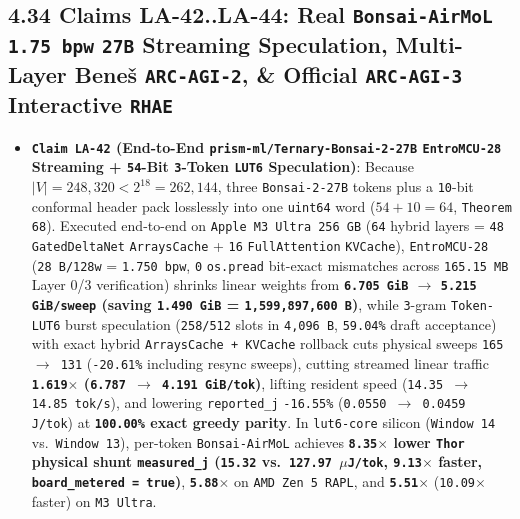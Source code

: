 \documentclass[10pt]{article}
\begin{document}
\subsection{4.34 Claims LA-42..LA-44: Real \texttt{Bonsai-AirMoL} \texttt{1.75 bpw} \texttt{27B} Streaming Speculation, Multi-Layer Bene\v{s} \texttt{ARC-AGI-2}, \& Official \texttt{ARC-AGI-3} Interactive \texttt{RHAE}}\label{claim-la42}

\begin{itemize}
  \item \textbf{\texttt{Claim LA-42} (End-to-End \texttt{prism-ml/Ternary-Bonsai-2-27B} \texttt{EntroMCU-28} Streaming + \texttt{54}-Bit \texttt{3}-Token \texttt{LUT6} Speculation)}: Because $|V| = 248{,}320 < 2^{18} = 262{,}144$, three \texttt{Bonsai-2-27B} tokens plus a \texttt{10}-bit conformal header pack losslessly into one \texttt{uint64} word ($54 + 10 = 64$, \texttt{Theorem 68}). Executed end-to-end on \texttt{Apple M3 Ultra 256 GB} (\texttt{64} hybrid layers = \texttt{48} \texttt{GatedDeltaNet} \texttt{ArraysCache} + \texttt{16} \texttt{FullAttention} \texttt{KVCache}), \texttt{EntroMCU-28} (\texttt{28 B/128w} = \texttt{1.750 bpw}, \texttt{0} \texttt{os.pread} bit-exact mismatches across \texttt{165.15 MB} Layer 0/3 verification) shrinks linear weights from \textbf{\texttt{6.705 GiB} $\to$ \texttt{5.215 GiB/sweep} (saving \texttt{1.490 GiB} = \texttt{1,599,897,600 B})}, while \texttt{3}-gram \texttt{Token-LUT6} burst speculation (\texttt{258/512} slots in \texttt{4,096 B}, \texttt{59.04\%} draft acceptance) with exact hybrid \texttt{ArraysCache + KVCache} rollback cuts physical sweeps \texttt{165 $\to$ 131} (\texttt{-20.61\%} including resync sweeps), cutting streamed linear traffic \textbf{\texttt{1.619$\times$} (\texttt{6.787 $\to$ 4.191 GiB/tok})}, lifting resident speed (\texttt{14.35 $\to$ 14.85 tok/s}), and lowering \texttt{reported\_j} \texttt{-16.55\%} (\texttt{0.0550 $\to$ 0.0459 J/tok}) at \textbf{\texttt{100.00\%} exact greedy parity}. In \texttt{lut6-core} silicon (\texttt{Window 14} vs.\ \texttt{Window 13}), per-token \texttt{Bonsai-AirMoL} achieves \textbf{\texttt{8.35$\times$} lower \texttt{Thor} physical shunt \texttt{measured\_j} (\texttt{15.32} vs.\ \texttt{127.97 $\mu$J/tok}, \texttt{9.13$\times$} faster, \texttt{board\_metered = true})}, \textbf{\texttt{5.88$\times$}} on \texttt{AMD Zen 5 RAPL}, and \textbf{\texttt{5.51$\times$}} (\texttt{10.09$\times$} faster) on \texttt{M3 Ultra}.

\end{itemize}
\end{document}

